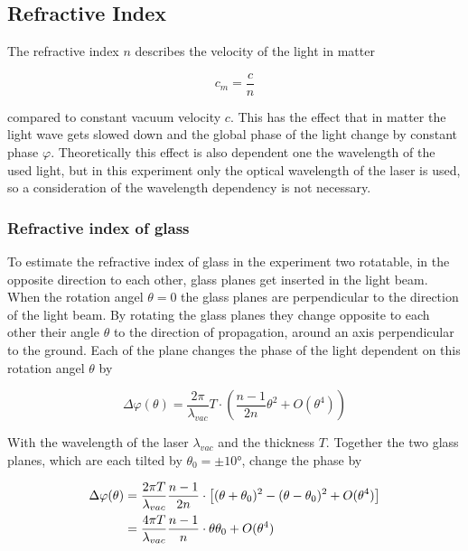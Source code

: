 \subsection{Refractive Index}
The refractive index $n$ describes the velocity of the light in matter

\begin{equation}
	c_m=\frac{c}{n}
\end{equation}

compared to constant vacuum velocity $c$. 
This has the effect that in matter the light wave gets slowed down and the global phase of the light change by constant phase $\varphi $.
Theoretically this effect is also dependent one the wavelength of the used light, but in this experiment only the optical wavelength of the laser is used, 
so a consideration of the wavelength dependency is not necessary. 

\subsubsection{Refractive index of glass}
To estimate the refractive index of glass in the experiment two rotatable, in the opposite direction to each other, glass
planes get inserted in the light beam. When the rotation angel $\theta=0 $ the glass planes are perpendicular to the direction of the light beam. 
By rotating the glass planes they change opposite to each other their angle $\theta$ to the direction of propagation, around an axis perpendicular to the ground. 
Each of the plane changes the phase of the light dependent on this rotation angel $\theta $ by

\begin{equation}
	\Delta \varphi(\theta ) =\frac{2\pi }{\lambda_{vac}}T \cdot \left(\frac{n-1}{2n}\theta ^2 +O(\theta ^4)  \right)
\end{equation}

With the wavelength of the laser $\lambda_{vac}$ and the thickness $T$.
Together the two glass planes, which are each tilted by $\theta_0 =\pm 10°$,
change the phase by

\begin{align}
	\Delta \varphi(\theta ) & =\frac{2\pi T}{\lambda_{vac}} \frac{n-1}{2n} \cdot \left[(\theta+\theta_0 )^2 - (\theta-\theta_0 )^2 +O(\theta ^4)  \right] \notag \\
	                        & =\frac{4\pi T}{\lambda_{vac}} \frac{n-1}{n} \cdot \theta\theta_0  +O(\theta ^4) \label{eq:glass}
\end{align}

